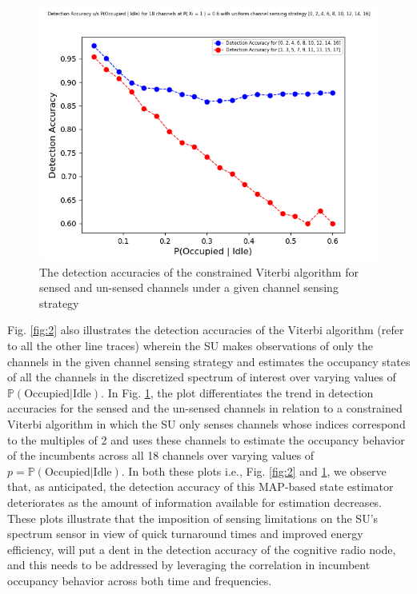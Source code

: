 \documentclass[10pt,twocolumn]{IEEEtran}
\begin{document}
\begin{figure}
    \centering
    \includegraphics[scale=0.5]{Uniform_Channel_Sensing_1.png}
    \caption{The detection accuracies of the constrained Viterbi algorithm for sensed and un-sensed channels under a given channel sensing strategy}
    \label{fig:3}
\end{figure}
Fig. \ref{fig:2} also illustrates the detection accuracies of the Viterbi algorithm (refer to all the other line traces) wherein the SU makes observations of only the channels in the given channel sensing strategy and estimates the occupancy states of all the channels in the discretized spectrum of interest over varying values of $\mathbb{P}(\text{Occupied}|\text{Idle})$. In Fig. \ref{fig:3}, the plot differentiates the trend in detection accuracies for the sensed and the un-sensed channels in relation to a constrained Viterbi algorithm in which the SU only senses channels whose indices correspond to the multiples of 2 and uses these channels to estimate the occupancy behavior of the incumbents across all 18 channels over varying values of $p = \mathbb{P}(\text{Occupied}|\text{Idle})$. In both these plots i.e., Fig. \ref{fig:2} and \ref{fig:3}, we observe that, as anticipated, the detection accuracy of this MAP-based state estimator deteriorates as the amount of information available for estimation decreases. These plots illustrate that the imposition of sensing limitations on the SU's spectrum sensor in view of quick turnaround times and improved energy efficiency, will put a dent in the detection accuracy of the cognitive radio node, and this needs to be addressed by leveraging the correlation in incumbent occupancy behavior across both time and frequencies.
\end{document}
